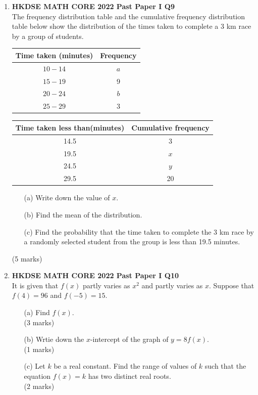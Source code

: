 \documentclass[12pt]{article}
\begin{document}
\begin{enumerate}
	\item \textbf{HKDSE MATH CORE 2022 Past Paper I Q9}\\
	The frequency distribution table and the cumulative frequency distribution table below show the distribution of the times taken to complete a 3 km race by a group of students.
	\begin{table}[h]
		\centering
		\begin{minipage}{.4\textwidth}
		  \centering
		  \begin{tabular}{ | c | c | }
			\hline
			Time taken (minutes) & Frequency \\
			\hline
			$10 - 14$ & $a$ \\
			\hline			
			$15 - 19$ & 9 \\
			\hline
			$20 - 24$ & $b$ \\
			\hline
			$25 - 29$ & 3 \\
			\hline
		  \end{tabular}
		\end{minipage}
		\begin{minipage}{.5\textwidth}
		  \centering
		  \begin{tabular}{ | c | c | }
			\hline
			Time taken less than(minutes) & Cumulative frequency\\
			\hline
			14.5 & 3 \\
			\hline
			19.5 & $x$ \\
			\hline
			24.5 & $y$ \\
			\hline
			29.5 & 20 \\
			\hline
		  \end{tabular}
		\end{minipage}
		\label{tab:two_tables}
	\end{table}
	\begin{enumerate}
		\item[(a)] Write down the value of $x$.
		\item[(b)] Find the mean of the distribution.
		\item[(c)] Find the probability that the time taken to complete the 3 km race by a randomly selected student from the group is less than 19.5 minutes.
	\end{enumerate}
	(5 marks)

	\item \textbf{HKDSE MATH CORE 2022 Past Paper I Q10}\\
	It is given that $f(x)$ partly varies as $x^2$ and partly varies as $x$. Suppose that $f(4) = 96$ and $f(-5) = 15$.
	\begin{enumerate}
		\item[(a)] Find $f(x)$. \\(3 marks)
		\item[(b)] Wrtie down the $x$-intercept of the graph of $y = 8f(x)$. \\(1 marks)
		\item[(c)] Let $k$ be a real constant. Find the range of values of $k$ such that the equation $f(x) = k$ has two distinct real roots. \\(2 marks)
	\end{enumerate}


\end{enumerate}
\end{document}
